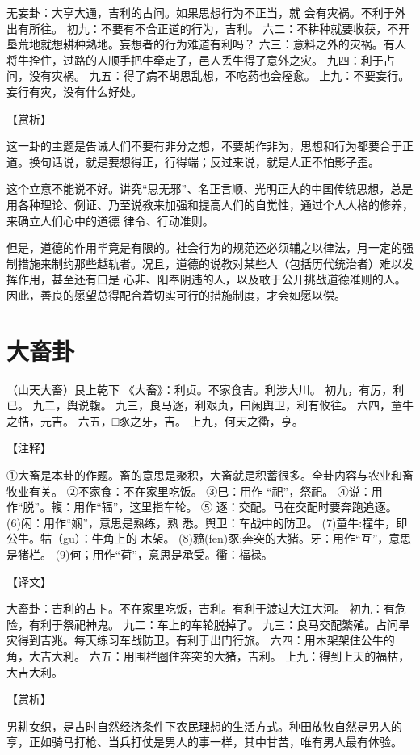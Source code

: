 \documentclass[12pt,UTF8]{ctexbook}
\begin{document}
无妄卦：大亨大通，吉利的占问。如果思想行为不正当，就 会有灾祸。不利于外出有所往。
初九：不要有不合正道的行为，吉利。
六二：不耕种就要收获，不开垦荒地就想耕种熟地。妄想者的行为难道有利吗？
六三：意料之外的灾祸。有人将牛拴住，过路的人顺手把牛牵走了，邑人丢牛得了意外之灾。
九四：利于占问，没有灾祸。
九五：得了病不胡思乱想，不吃药也会痊愈。
上九：不要妄行。妄行有灾，没有什么好处。

【赏析】

这一卦的主题是告诫人们不要有非分之想，不要胡作非为，思想和行为都要合于正道。换句话说，就是要想得正，行得端；反过来说，就是人正不怕影子歪。

这个立意不能说不好。讲究“思无邪”、名正言顺、光明正大的中国传统思想，总是用各种理论、例证、乃至说教来加强和提高人们的自觉性，通过个人人格的修养，来确立人们心中的道德 律令、行动准则。

但是，道德的作用毕竟是有限的。社会行为的规范还必须辅之以律法，月一定的强制措施来制约那些越轨者。况且，道德的说教对某些人（包括历代统治者）难以发挥作用，甚至还有口是 心非、阳奉阴违的人，以及敢于公开挑战道德准则的人。因此，善良的愿望总得配合着切实可行的措施制度，才会如愿以偿。

\chapter{大畜卦}

（山天大畜）艮上乾下
《大畜》：利贞。不家食吉。利涉大川。
初九，有厉，利已。
九二，舆说輹。
九三，良马逐，利艰贞，曰闲舆卫，利有攸往。
六四，童牛之牿，元吉。
六五，□豕之牙，吉。
上九，何天之衢，亨。

【注释】

①大畜是本卦的作题。畜的意思是聚积，大畜就是积蓄很多。全卦内容与农业和畜牧业有关。
②不家食：不在家里吃饭。
③巳：用作 “祀”，祭祀。
④说：用作“脱”。輹：用作“辐”，这里指车轮。
⑤ 逐：交配。马在交配时要奔跑追逐。
(6)闲：用作“娴”，意思是熟练，熟 悉。舆卫：车战中的防卫。
(7)童牛:犝牛，即公牛。牯（gu）：牛角上的 木架。
(8)豮(fen)豕:奔突的大猪。牙：用作“互”，意思是猪栏。
(9)何；用作“荷”，意思是承受。衢：福禄。

【译文】

大畜卦：吉利的占卜。不在家里吃饭，吉利。有利于渡过大江大河。
初九：有危险，有利于祭祀神鬼。
九二：车上的车轮脱掉了。
九三：良马交配繁殖。占问旱灾得到吉兆。每天练习车战防卫。有利于出门行旅。
六四：用木架架住公牛的角，大吉大利。
六五：用围栏圈住奔突的大猪，吉利。
上九：得到上天的福枯，大吉大利。

【赏析】

男耕女织，是古时自然经济条件下农民理想的生活方式。种田放牧自然是男人的亨，正如骑马打枪、当兵打仗是男人的事一样，其中甘苦，唯有男人最有体验。
\end{document}
